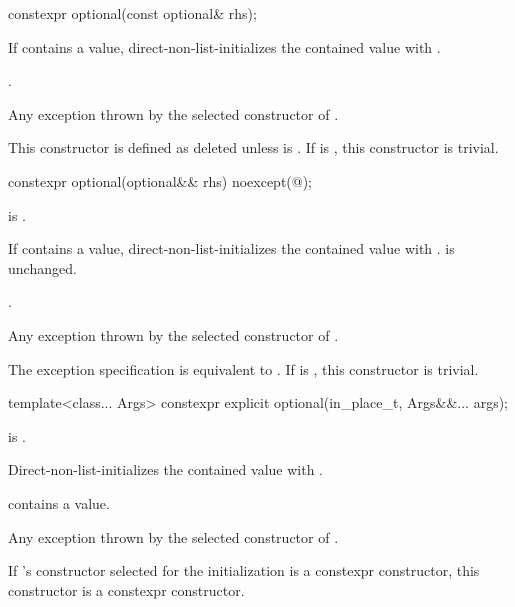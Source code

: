 %
\begin{itemdecl}
constexpr optional(const optional& rhs);
\end{itemdecl}

\begin{itemdescr}
\pnum
\effects
If  contains a value, direct-non-list-initializes the contained value
with .

\pnum
\ensures
{}.

\pnum
\throws
Any exception thrown by the selected constructor of .

\pnum
\remarks
This constructor is defined as deleted unless
 is .
If  is ,
this constructor is trivial.
\end{itemdescr}

%
\begin{itemdecl}
constexpr optional(optional&& rhs) noexcept(@\seebelow@);
\end{itemdecl}

\begin{itemdescr}
\pnum
\constraints
{} is .

\pnum
\effects
If  contains a value, direct-non-list-initializes the contained value
with .
 is unchanged.

\pnum
\ensures
{}.

\pnum
\throws
Any exception thrown by the selected constructor of .

\pnum
\remarks
The exception specification is equivalent to
.
If  is ,
this constructor is trivial.
\end{itemdescr}

%
\begin{itemdecl}
template<class... Args> constexpr explicit optional(in_place_t, Args&&... args);
\end{itemdecl}

\begin{itemdescr}
\pnum
\constraints
{} is .

\pnum
\effects
Direct-non-list-initializes the contained value with .

\pnum
\ensures
{} contains a value.

\pnum
\throws
Any exception thrown by the selected constructor of .

\pnum
\remarks
If 's constructor selected for the initialization is a constexpr constructor, this constructor is a constexpr constructor.
\end{itemdescr}

